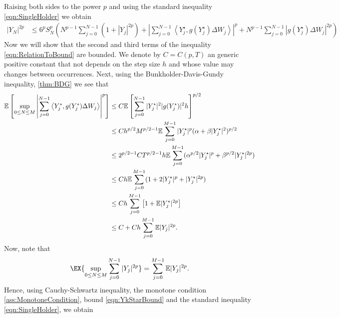 \documentclass[3p]{elsarticle}
\theoremstyle{definition}
\theoremstyle{plain}%
\theoremstyle{remark}
\newcommand{\m}[1]{\mathbb{E}#1}
\newcommand{\innerprod}[2]{\left\langle#1, #2\right\rangle}
\begin{document}
\begin{pf}
	Raising both sides to the power $p$ and using the standard inequality \eqref{eqn:SingleHolder} we obtain
	\begin{align}\label{eqn:RelationToBound}
		|Y_N|^{2p}	
			&\leq
				6^{p} S_N^p
				\left(
					N^{p-1}
						\sum_{j=0}^{N-1}
						(1+|Y_j|^{2p})	
					+
					\left|
						\sum_{j=0}^{N-1}
						\innerprod{Y_j^{\star}}{g(Y_j^{\star}) \Delta W_j}
					\right|^p
					+
					N^{p-1}
					\sum_{j=0}^{N-1}
						\left|
							g(Y_j^{\star}) \Delta W_j
						\right|^{2 p}				
				\right)
	\end{align}
	Now we will show that the second and third terms of the inequality \eqref{eqn:RelationToBound} are bounded.
	We denote by $C=C(p,T)$ an generic positive constant that not depends on  the step size $h$ and whose
	value may changes between occurrences.
	Next, using the Bunkholder-Davis-Gundy inequality,
	\eqref{thm:BDG}
	we see that
	\begin{align}\label{eqn:BoundSecondTerm}
		\m
		\left[
			\sup_{0\leq N \leq M}
			\left|
				\sum_{j=0}^{N-1}
					\innerprod{Y_j^{\star}}{g(Y_j^{\star})\Delta W_j}
			\right|^{p}
		\right]
		&\leq
			C\m
			\left[
				\sum_{j=0}^{N-1}
					|Y_j^{\star}|^2
					|g(Y_j^{\star})|^2
					h
			\right]^{p/2}
			\notag\\
		&\leq
			C h^{p/2}M^{p/2-1}
			\m
				\sum_{j=0}^{M-1}
					|Y_j^{\star}|^p (\alpha +\beta |Y_j^{\star}|^2)^{p/2}
			\notag\\
		&\leq
			2^{p/2-1}C T^{p/2-1} h  
			\m
			\sum_{j=0}^{M-1}
				(\alpha^{p/2}|Y_j^{\star}|^p +\beta^{p/2} |Y_j^{\star}|^{2p})
			\notag\\
		&\leq
			C h
			\m
			\sum_{j=0}^{M-1}
				(1+2|Y_j^{\star}|^p + |Y_j^{\star}|^{2p})
			\notag\\
		&\leq
			C h 
			\sum_{j=0}^{M-1}
			\left[
				1+\m|Y_j^{\star}|^{2p}
			\right]
			\notag\\
		&\leq
			C 
			+ 
			C h 
			\sum_{j=0}^{M-1}
				\m|Y_j|^{2p}	
			.
	\end{align}
	Now, note that 
	\begin{equation}\label{eqn:SupOfSum}
		\EX{
			\sup_{0\leq N\leq M}
				\sum_{j=0}^{N-1}
				|Y_j|^{2p}
		}
		=
		\sum_{j=0}^{M-1}
			\m|Y_j|^{2p}.
	\end{equation}
	Hence, using Cauchy-Schwartz inequality, the monotone condition 
	\eqref{ass:MonotoneCondition}, bound \eqref{eqn:YkStarBound}
	and the standard inequality \eqref{eqn:SingleHolder}, we obtain
	\begin{align}

\end{align}
\end{pf}
\end{document}
